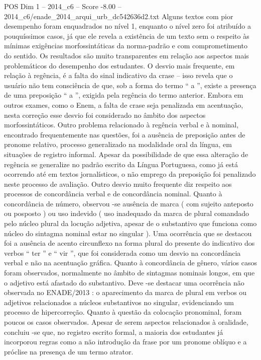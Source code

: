 \begin{textsample}{POS Dim 1 – 2014\_c6 – Score -8.00 – 2014\_c6/enade\_2014\_arqui\_urb\_dc542636d2.txt}
Alguns textos com pior desempenho foram enquadrados no nível 1, enquanto o nível zero foi atribuído a pouquíssimos casos, já que ele revela a existência de um texto sem o respeito às mínimas exigências morfossintáticas da norma-padrão e com comprometimento do sentido.
Os resultados são muito transparentes em relação aos aspectos mais problemáticos do desempenho dos estudantes.
O desvio mais frequente, em relação à regência, é a falta do sinal indicativo da crase – isso revela que o usuário não tem consciência de que, sob a forma do termo “ a ”, existe a presença de uma preposição “ a ”, exigida pela regência do termo anterior.
Embora em outros exames, como o Enem, a falta de crase seja penalizada em acentuação, nesta correção esse desvio foi considerado no âmbito dos aspectos morfossintáticos.
Outro problema relacionado à regência verbal e à nominal, encontrado frequentemente nas questões, foi a ausência de preposição antes de pronome relativo, processo generalizado na modalidade oral da língua, em situações de registro informal.
Apesar da possibilidade de que essa alteração de regência se generalize no padrão escrito da Língua Portuguesa, como já está ocorrendo até em textos jornalísticos, o não emprego da preposição foi penalizado neste processo de avaliação.
Outro desvio muito frequente diz respeito aos processos de concordância verbal e de concordância nominal.
Quanto à concordância de número, observou -se ausência de marca ( com sujeito anteposto ou posposto ) ou uso indevido ( uso inadequado da marca de plural comandado pelo núcleo plural da locução adjetiva, apesar de o substantivo que funciona como núcleo do sintagma nominal estar no singular ).
Uma ocorrência que se destacou foi a ausência de acento circunflexo na forma plural do presente do indicativo dos verbos “ ter ” e “ vir ”, que foi considerada como um desvio na concordância verbal e não na acentuação gráfica.
Quanto à concordância de gênero, vários casos foram observados, normalmente no âmbito de sintagmas nominais longos, em que o adjetivo está afastado do substantivo.
Deve -se destacar uma ocorrência não observada no ENADE/2013 : o aparecimento da marca de plural em verbos ou adjetivos relacionados a núcleos substantivos no singular, evidenciando um processo de hipercorreção.
Quanto à questão da colocação pronominal, foram poucos os casos observados.
Apesar de serem aspectos relacionados à oralidade, concluiu -se que, no registro escrito formal, a maioria dos estudantes já incorporou regras como a não introdução da frase por um pronome oblíquo e a próclise na presença de um termo atrator.

\end{textsample}
